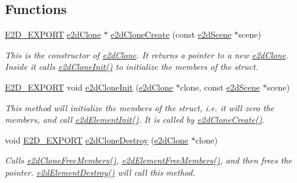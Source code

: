 \subsection*{Functions}
\begin{DoxyCompactItemize}
\item 
\hyperlink{Ez2DS_8h_a9f14e9cb869e1a85fdaba03afcca0df9}{E2\-D\-\_\-\-E\-X\-P\-O\-R\-T} \hyperlink{structe2dClone}{e2d\-Clone} $\ast$ \hyperlink{group__e2dClone_ga338cd34d170f00f5cf140cbc7c09b15e}{e2d\-Clone\-Create} (const \hyperlink{structe2dScene}{e2d\-Scene} $\ast$scene)
\begin{DoxyCompactList}\small\item\em This is the constructor of \hyperlink{structe2dClone}{e2d\-Clone}. It returns a pointer to a new \hyperlink{structe2dClone}{e2d\-Clone}. Inside it calls \hyperlink{group__e2dClone_ga8a4825b7db0df1dc9aba4a82b46cf9cc}{e2d\-Clone\-Init()} to initialize the members of the struct. \end{DoxyCompactList}\item 
\hyperlink{Ez2DS_8h_a9f14e9cb869e1a85fdaba03afcca0df9}{E2\-D\-\_\-\-E\-X\-P\-O\-R\-T} void \hyperlink{group__e2dClone_ga8a4825b7db0df1dc9aba4a82b46cf9cc}{e2d\-Clone\-Init} (\hyperlink{structe2dClone}{e2d\-Clone} $\ast$clone, const \hyperlink{structe2dScene}{e2d\-Scene} $\ast$scene)
\begin{DoxyCompactList}\small\item\em This method will initialize the members of the struct, i.\-e. it will zero the members, and call \hyperlink{group__e2dElement_ga8734d10ef40a380dfc51bfe1790a92a7}{e2d\-Element\-Init()}. It is called by \hyperlink{group__e2dClone_ga338cd34d170f00f5cf140cbc7c09b15e}{e2d\-Clone\-Create()}. \end{DoxyCompactList}\item 
void \hyperlink{Ez2DS_8h_a9f14e9cb869e1a85fdaba03afcca0df9}{E2\-D\-\_\-\-E\-X\-P\-O\-R\-T} \hyperlink{group__e2dClone_ga7681ea62c6809fe1daf1c4ac6e873df5}{e2d\-Clone\-Destroy} (\hyperlink{structe2dClone}{e2d\-Clone} $\ast$clone)
\begin{DoxyCompactList}\small\item\em Calls \hyperlink{group__e2dClone_gae3437977dc551bb014cefcfad690009a}{e2d\-Clone\-Free\-Members()}, \hyperlink{group__e2dElement_ga5c3a7d29f41609686a3a455bad6ef7c9}{e2d\-Element\-Free\-Members()}, and then frees the pointer. \hyperlink{group__e2dElement_ga2fdc3435e0e1ac9d1e1f0b330d9539fa}{e2d\-Element\-Destroy()} will call this method. \end{DoxyCompactList}\item 

\end{DoxyCompactItemize}

